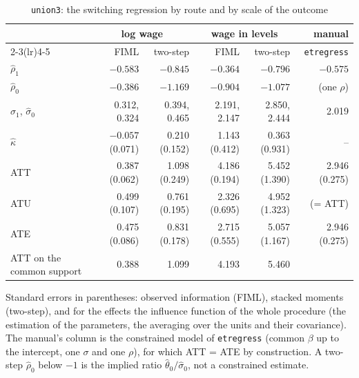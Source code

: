 \documentclass[11pt,a4paper]{article}
\theoremstyle{plain}
\theoremstyle{definition}
\theoremstyle{remark}
\newcommand{\1}{\mathbf{1}}
\newcommand{\cmd}[1]{\texttt{#1}}
\begin{document}
\begin{table}[!htb]
\centering
\caption{\cmd{union3}: the switching regression by route and by scale of the outcome}
\label{tab:u3:est}
\footnotesize
\begin{tabular}{@{}lrrrrr@{}}
\toprule
 & \multicolumn{2}{c}{log wage} & \multicolumn{2}{c}{wage in levels} & manual \\
\cmidrule(lr){2-3}\cmidrule(lr){4-5}
 & FIML & two-step & FIML & two-step & \cmd{etregress} \\
\midrule
$\hat\rho_1$ & $-0.583$ & $-0.845$ & $-0.364$ & $-0.796$ & $-0.575$ \\
$\hat\rho_0$ & $-0.386$ & $-1.169$ & $-0.904$ & $-1.077$ & (one $\rho$) \\
$\hat\sigma_1$, $\hat\sigma_0$ & 0.312, 0.324 & 0.394, 0.465 & 2.191, 2.147 & 2.850, 2.444 & 2.019 \\
$\hat\kappa$ & $-0.057$ (0.071) & 0.210 (0.152) & 1.143 (0.412) & 0.363 (0.931) & -- \\
ATT & 0.387 (0.062) & 1.098 (0.249) & 4.186 (0.194) & 5.452 (1.390) & 2.946 (0.275) \\
ATU & 0.499 (0.107) & 0.761 (0.195) & 2.326 (0.695) & 4.952 (1.323) & (= ATT) \\
ATE & 0.475 (0.086) & 0.831 (0.178) & 2.715 (0.555) & 5.057 (1.167) & 2.946 (0.275) \\
ATT on the common support & 0.388 & 1.099 & 4.193 & 5.460 & \\
\bottomrule
\end{tabular}
\parbox{0.95\textwidth}{\footnotesize Standard errors in parentheses: observed information (FIML), stacked moments (two-step), and for the effects the influence function of the whole procedure (the estimation of the parameters, the averaging over the units and their covariance). The manual's column is the constrained model of \cmd{etregress} (common $\beta$ up to the intercept, one $\sigma$ and one $\rho$), for which ATT = ATE by construction. A two-step $\hat\rho_0$ below $-1$ is the implied ratio $\hat\theta_0/\hat\sigma_0$, not a constrained estimate.}
\end{table}
\end{document}
